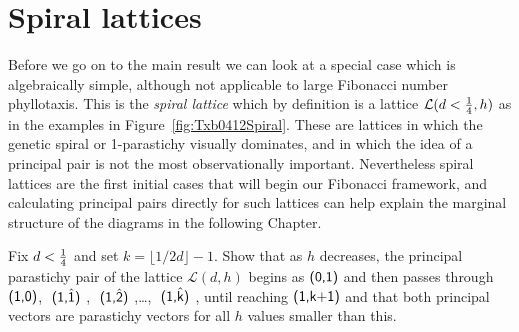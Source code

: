 \section{Spiral lattices}
\label{sec:spiral}
Before we go on to the main result we can look at a special case which is algebraically simple, although not applicable to large Fibonacci number phyllotaxis. This is the \emph{spiral lattice} which by definition is a lattice $\mathcal{L}(d<\textstyle{\frac{1}{4}},h)$ as in the examples in Figure~\ref{fig:Txb0412Spiral}. These are lattices in which
the genetic spiral or 1-parastichy visually dominates, and in which the idea of a principal pair is not the most observationally important. 
%
Nevertheless spiral lattices are the first initial cases that will begin
our Fibonacci framework, and calculating principal pairs directly for such lattices can help explain the marginal structure of the diagrams in the following Chapter.
\begin{jExercise}\label{ex:pspiral}
	Fix  $d<\textstyle{\frac{1}{4}}$ and set  $k=\lfloor1/2d\rfloor-1$.
	Show that as $h$ decreases, the principal parastichy pair of the lattice $\mathcal{L}(d,h)$ begins as 
	 $\textsf{(0,1)}$ and then passes through $\textsf{(1,0)}$,  $\textsf{ (\ensuremath{\textsf{1}},\ensuremath{\hat{\textsf{1}}}) }$,
	  $\textsf{ (\ensuremath{\textsf{1}},\ensuremath{\hat{\textsf{2}}}) }$,\ldots ,  $\textsf{ (\ensuremath{\textsf{1}},\ensuremath{\hat{\textsf{k}}}) }$, until reaching $\textsf{(1,k+1)}$ and that  both principal vectors are parastichy vectors for all $h$ values smaller than this. 
	 
\end{jExercise} 
